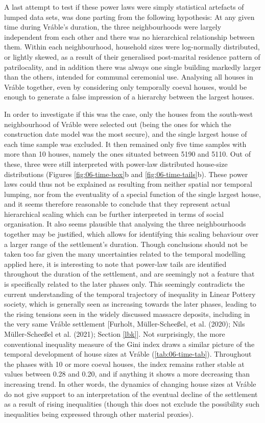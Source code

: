 \documentclass[
  12pt,
  a4paper, twoside]{book}
\begin{document}
A last attempt to test if these power laws were simply statistical artefacts of lumped data sets, was done parting from the following hypothesis: At any given time during Vráble's duration, the three neighbourhoods were largely independent from each other and there was no hierarchical relationship between them. Within each neighbourhood, household sizes were log-normally distributed, or lightly skewed, as a result of their generalised post-marital residence pattern of patrilocality, and in addition there was always one single building markedly larger than the others, intended for communal ceremonial use. Analysing all houses in Vráble together, even by considering only temporally coeval houses, would be enough to generate a false impression of a hierarchy between the largest houses.

In order to investigate if this was the case, only the houses from the south-west neighbourhood of Vráble were selected out (being the ones for which the construction date model was the most secure), and the single largest house of each time sample was excluded. It then remained only five time samples with more than 10 houses, namely the ones situated between 5190 and 5110. Out of these, three were still interpreted with power-law distributed house-size distributions (Figures \ref{fig:06-time-box}b and \ref{fig:06-time-tails}b). These power laws could thus not be explained as resulting from neither spatial nor temporal lumping, nor from the eventuality of a special function of the single largest house, and it seems therefore reasonable to conclude that they represent actual hierarchical scaling which can be further interpreted in terms of social organisation. It also seems plausible that analysing the three neighbourhoods together may be justified, which allows for identifying this scaling behaviour over a larger range of the settlement's duration. Though conclusions should not be taken too far given the many uncertainties related to the temporal modelling applied here, it is interesting to note that power-law tails are identified throughout the duration of the settlement, and are seemingly not a feature that is specifically related to the later phases only. This seemingly contradicts the current understanding of the temporal trajectory of inequality in Linear Pottery society, which is generally seen as increasing towards the later phases, leading to the rising tensions seen in the widely discussed massacre deposits, including in the very same Vráble settlement {[}Furholt, Müller-Scheeßel, et al. (2020); Nils Müller-Scheeßel et al. (2021); Section \ref{lbk}{]}. Not surprisingly, the more conventional inequality measure of the Gini index draws a similar picture of the temporal development of house sizes at Vráble (\ref{tab:06-time-tab}). Throughout the phases with 10 or more coeval houses, the index remains rather stable at values between 0.28 and 0.20, and if anything it shows a more decreasing than increasing trend. In other words, the dynamics of changing house sizes at Vráble do not give support to an interpretation of the eventual decline of the settlement as a result of rising inequalities (though this does not exclude the possibility such inequalities being expressed through other material proxies).
\end{document}
